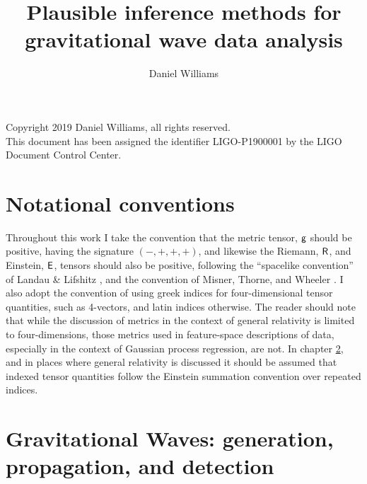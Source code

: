 \documentclass[oneside]{kentigern}
\title{Plausible inference methods for gravitational wave data analysis}
\author{Daniel Williams}
\theoremstyle{definition}
\begin{document}
\openright
\frontmatter
\thesistitle
\newpage \newpage

\begin{abstract}

\end{abstract}
\newpage

Copyright 2019 Daniel Williams, all rights reserved.\\

This document has been assigned the identifier LIGO-P1900001 by the LIGO Document Control Center.
\newpage

%



\newpage
\tableofcontents
\newpage
\listoffigures
\newpage
\listoftables
\newpage

\printglossary[type=\acronymtype]



\newpage
\chapter{Notational conventions}
\label{sec:notation-conventions}

Throughout this work I take the convention that the metric tensor, $\mathsf{g}$ should be positive, having the signature $(-,+,+,+)$, and likewise the Riemann, $\mathsf{R}$, and Einstein, $\mathsf{E}$, tensors should also be positive, following the ``spacelike convention'' of Landau \& Lifshitz \cite{1975ctf..book.....L}, and the convention of Misner, Thorne, and Wheeler \cite{mtw}. I also adopt the convention of using greek indices for four-dimensional tensor quantities, such as 4-vectors, and latin indices otherwise. The reader should note that while the discussion of metrics in the context of general relativity is limited to four-dimensions, those metrics used in feature-space descriptions of data, especially in the context of Gaussian process regression, are not.
In chapter \ref{cha:intro}, and in places where general relativity is discussed it should be assumed that indexed tensor quantities follow the Einstein summation convention over repeated indices.

\mainmatter
\glsresetall
\chapter[Gravitational Waves: Generation, propagation, and detection]{Gravitational Waves: generation, propagation, and detection}
\label{cha:intro}
\end{document}
